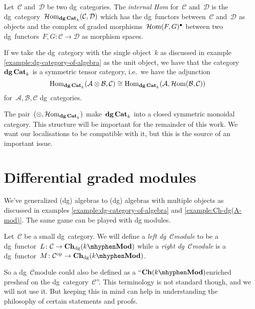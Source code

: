 \begin{definition}
  \label{definition:internal-Hom-dgCat}
  Let~$\mathcal{C}$ and~$\mathcal{D}$ be two dg~categories. The \emph{internal Hom} for~$\mathcal{C}$ and~$\mathcal{D}$ is the dg~category~$\operatorname{\mathcal{H}om}_{\mathbf{dg\,Cat}_k}(\mathcal{C},\mathcal{D})$ which has the dg~functors between~$\mathcal{C}$ and~$\mathcal{D}$ as objects and the complex of graded morphisms~$\operatorname{\mathcal{H}om}(F,G)^\bullet$ between two dg~functors~$F,G\colon\mathcal{C}\to\mathcal{D}$ as morphism spaces.
\end{definition}
If we take the dg~category with the single object~$k$ as discussed in example \ref{example:dg-category-of-algebra} as the unit object, we have that the category~$\mathbf{dg\,Cat}_k$ is a symmetric tensor category, i.e.\ we have the adjunction
\begin{equation}
  \mathrm{Hom}_{\mathbf{dg\,Cat}_k}(\mathcal{A}\otimes\mathcal{B},\mathcal{C})\cong\mathrm{Hom}_{\mathbf{dg\,Cat}_k}(\mathcal{A},\operatorname{\mathcal{H}om}(\mathcal{B},\mathcal{C}))
  \label{equation:tensor-Hom-Chk-adjunction}
\end{equation}
for~$\mathcal{A},\mathcal{B},\mathcal{C}$ dg~categories.

The pair~$(\otimes,\operatorname{\mathcal{H}om}_{\mathbf{dg\,Cat}_k})$ make~$\mathbf{dg\,Cat}_k$ into a closed symmetric monoidal category. This structure will be important for the remainder of this work. We want our localisations to be compatible with it, but this is the source of an important issue.


\section{Differential graded modules}
We've generalized (dg) algebras to (dg) algebras with multiple objects as discussed in examples \ref{example:dg-category-of-algebra} and \ref{example:Ch-dg(A-mod)}. The same game can be played with dg modules.

\begin{definition}
  Let~$\mathcal{C}$ be a small dg~category. We will define a \emph{left dg~$\mathcal{C}$\dash module} to be a dg~functor~$L\colon\mathcal{C}\to\Ch_\dg(k\mhyphen\Mod)$ while a \emph{right dg~$\mathcal{C}$\dash module} is a dg~functor~$M\colon\mathcal{C}^\opp\to\Ch_\dg(k\mhyphen\Mod)$.
\end{definition}
So a dg~$\mathcal{C}$\dash module could also be defined as a ``$\Ch(k\mhyphen\Mod)$\dash enriched presheaf on the dg~category~$\mathcal{C}$''. This terminology is not standard though, and we will not use it. But keeping this in mind can help in understanding the philosophy of certain statements and proofs.

